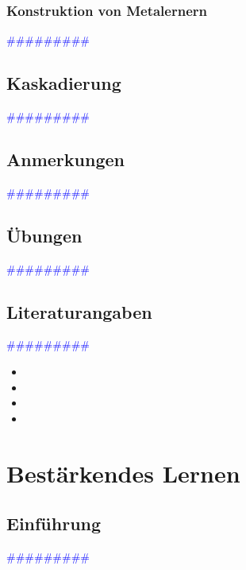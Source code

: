 \documentclass{article}
\begin{document}
    \subsubsection{Konstruktion von Metalernern} %
      \textcolor{blue}{\#\#\#\#\#\#\#\#\#}
  \subsection{Kaskadierung} %
      \textcolor{blue}{\#\#\#\#\#\#\#\#\#}
  \subsection{Anmerkungen} %
      \textcolor{blue}{\#\#\#\#\#\#\#\#\#}
  \subsection{Übungen} %
      \textcolor{blue}{\#\#\#\#\#\#\#\#\#}
  \subsection{Literaturangaben} %
      \textcolor{blue}{\#\#\#\#\#\#\#\#\#}

      \begin{itemize}
      \color{red}
        \item
        \item
      \color{ForestGreen}
        \item
        \item
      \end{itemize}




\newpage
\section{Bestärkendes Lernen} %
  \subsection{Einführung} %
      \textcolor{blue}{\#\#\#\#\#\#\#\#\#}
\end{document}
